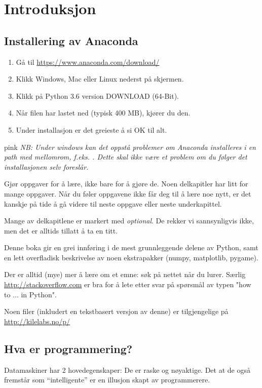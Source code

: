 \chapter{Introduksjon}
\section{Installering av Anaconda}
\begin{enumerate}[nosep]
\item Gå til \url{https://www.anaconda.com/download/}
\item Klikk Windows, Mac eller Linux nederst på skjermen.
\item Klikk på Python 3.6 version  DOWNLOAD  (64-Bit).
\item Når filen har lastet ned (typisk 400 MB), kjører du den.
\item Under installasjon er det greieste å si OK til alt.
\end{enumerate}
\begin{usncbox}{pink}
{\em NB: Under windows kan det oppstå problemer om Anaconda installeres i en path med mellomrom, f.eks. . Dette skal ikke være et problem om du følger det installasjonen selv foreslår.}
\end{usncbox}

Gjør oppgaver for å lære, ikke bare for å gjøre de. Noen delkapitler har litt for mange oppgaver. Når du føler oppgavene ikke får deg til å lære noe nytt, er det kanskje på tide å gå videre til neste oppgave eller neste underkapittel. 

Mange av delkapitlene er markert med {\em optional}. De rekker vi sannsynligvis ikke, men det er alltids tillatt å ta en titt. 

Denne boka gir en grei innføring i de mest grunnleggende delene av Python, samt en lett overfladisk beskrivelse av noen ekstrapakker (numpy, matplotlib, pygame). 

Der er alltid (mye) mer å lære om et emne: søk på nettet når du lurer. Særlig \url{http://stackoverflow.com} er bra for å lete etter svar på spørsmål av typen "how to ... in Python". 

Noen filer (inkludert en tekstbasert versjon av denne) er tilgjengelige på \url{http://kilelabs.no/p/}

\section{Hva er programmering?}
Datamaskiner har 2 hovedegenskaper: De er raske og nøyaktige. Det at de også fremstår som ``intelligente'' er en illusjon skapt av programmerere.

